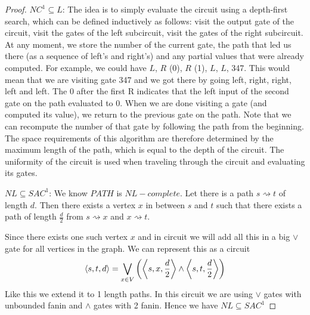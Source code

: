 \begin{proof}
	$NC^1\subseteq L$: The idea is to simply evaluate the circuit using a depth-first search, which can be defined inductively as follows: visit the output gate of the circuit, visit the gates of the left subcircuit, visit the gates of the right subcircuit. At any moment, we store the number of the current gate, the path that led us there (as a sequence of left’s and right’s) and any partial values that were already computed. For example, we could have $L$, $R$ (0), $R$ (1), $L$, $L$, 347. This would mean that we are visiting gate 347 and we got there by going left, right, right, left and left. The 0 after the first R indicates that the left input of the second gate on the path evaluated to 0. When we are done visiting a gate (and computed its value), we return to the previous gate on the path. Note that we can recompute the number of that gate by following the path from the beginning. The space requirements of this algorithm are therefore determined by the maximum length of the path, which is equal to the depth of the circuit. The uniformity of the circuit is used when traveling through the circuit and evaluating its gates. 
	
	$NL\subseteq SAC^1$: We know $PATH$ is $NL-complete$. Let there is a path $s\rightsquigarrow t$  of length $d$. Then there exists a vertex $x$ in between $s$ and $t$ such that there exists a path of length $\frac{d}{2}$ from $s\rightsquigarrow x$ and $x\rightsquigarrow t$. 
	\begin{center}
	\end{center}
	Since there exists one such vertex $x$ and in circuit we will add all this in a big $\vee$ gate for all vertices in the graph. We can represent this as a circuit$$\left\langle s,t,d\right\rangle=\bigvee_{x\in V}\left(\left\langle s,x,\frac{d}{2}\right\rangle \wedge \left\langle s,t,\frac{d}{2}\right\rangle\right)$$Like this we extend it to 1 length paths. In this circuit we are using $\vee$ gates with unbounded fanin and $\wedge$ gates with 2 fanin. Hence we have $NL\subseteq SAC^1$
\end{proof}